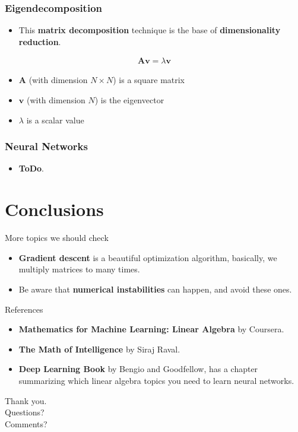 \documentclass[handout]{beamer}
\begin{document}
\begin{frame}[fragile]\frametitle{Eigendecomposition}
    \Large
    \begin{itemize}
        \item This \textbf{matrix decomposition} technique is the base of \textbf{dimensionality reduction}.
    \end{itemize}
    \begin{align*}
        \boldsymbol{Av} = \lambda \boldsymbol{v}
    \end{align*}
    \begin{itemize}
        \item $\boldsymbol{A}$ (with dimension $N\times N$) is a square matrix
        \item $\boldsymbol{v}$ (with dimension $N$) is the eigenvector
        \item $\lambda$ is a scalar value
    \end{itemize}
\end{frame}

\begin{frame}[fragile]\frametitle{Neural Networks}
    \begin{itemize}
        \item \textbf{ToDo}.
    \end{itemize}
\end{frame}

\section{Conclusions}

\begin{frame}{More topics we should check}
    \begin{itemize}
        \item \textbf{Gradient descent} is a beautiful optimization algorithm,
                basically, we multiply matrices to many times.
        \item Be aware that \textbf{numerical instabilities} can happen, and avoid these ones.
    \end{itemize} 
\end{frame}

\begin{frame}{References}
    \begin{itemize}
        \item \textbf{Mathematics for Machine Learning: Linear Algebra} by Coursera.
        \item \textbf{The Math of Intelligence} by Siraj Raval.
        \item \textbf{Deep Learning Book} by Bengio and Goodfellow, has a chapter summarizing
            which linear algebra topics you need to learn neural networks.
    \end{itemize}
\end{frame}

\begin{frame}
\huge{Thank you.}\\
\huge{Questions?}\\
\huge{Comments?}\\
\end{frame}
\end{document}

